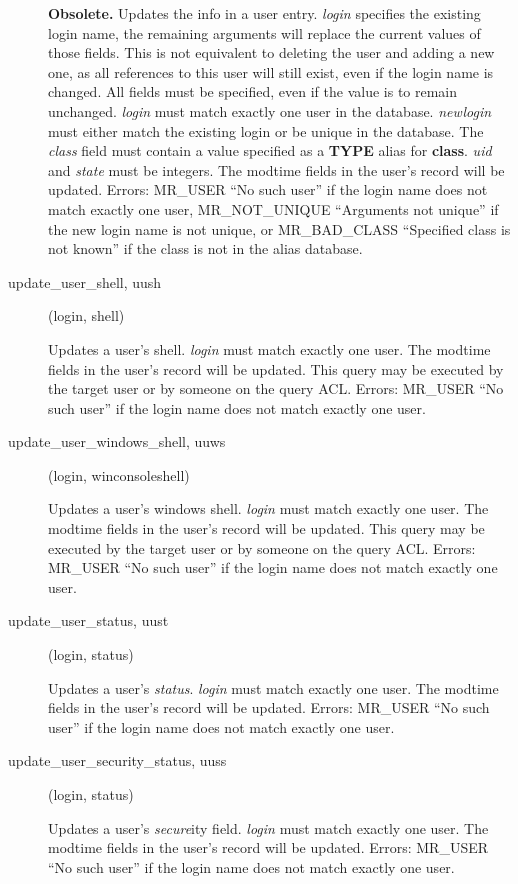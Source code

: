 \documentclass{article}
\begin{document}
\begin{description}
{\bf Obsolete.}  Updates the info in a user entry.  {\em login} specifies
the existing login name, the remaining arguments will replace the
current values of those fields.  This is not equivalent to deleting
the user and adding a new one, as all references to this user will
still exist, even if the login name is changed.  All fields must be
specified, even if the value is to remain unchanged.  {\em login} must
match exactly one user in the database.  {\em newlogin} must either
match the existing login or be unique in the database.  The {\em class}
field must contain a value specified as a {\bf TYPE} alias for
{\bf class}.  {\em uid} and {\em state} must be integers.  The modtime
fields in the user's record will be updated.  Errors: MR\_USER ``No such
user'' if the login name does not match exactly one user, MR\_NOT\_UNIQUE
``Arguments not unique'' if the new login name is not unique, or
MR\_BAD\_CLASS ``Specified class is not known'' if the class is not in the
alias database.

\item[update\_user\_shell, uush](login, shell)

Updates a user's shell.  {\em login} must match exactly one user.  The
modtime fields in the user's record will be updated.  This query may
be executed by the target user or by someone on the query ACL.
Errors: MR\_USER ``No such user'' if the login name does not match
exactly one user.

\item[update\_user\_windows\_shell, uuws](login, winconsoleshell)

Updates a user's windows shell. {\em login} must match exactly one
user.  The modtime fields in the user's record will be updated.  This
query may be executed by the target user or by someone on the query ACL.
Errors: MR\_USER ``No such user'' if the login name does not match
exactly one user.

\item[update\_user\_status, uust](login, status)

Updates a user's {\em status}.  {\em login} must match exactly one user.
The modtime fields in the user's record will be updated.  Errors:
MR\_USER ``No such user'' if the login name does not match exactly one
user.

\item[update\_user\_security\_status, uuss](login, status)

Updates a user's {\em secure}ity field.  {\em login} must match exactly
one user.  The modtime fields in the user's record will be updated.
Errors: MR\_USER ``No such user'' if the login name does not match
exactly one user.


\end{description}
\end{document}
